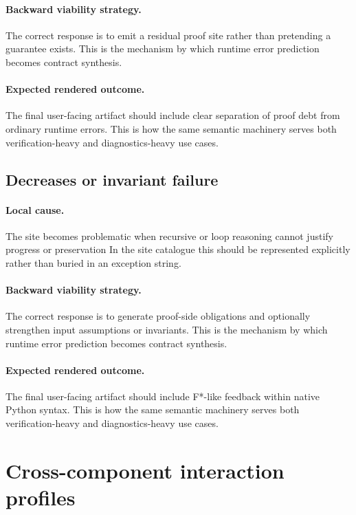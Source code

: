 \documentclass[11pt]{report}
\theoremstyle{definition}
\theoremstyle{plain}
\begin{document}
\paragraph{Backward viability strategy.}
The correct response is to emit a residual proof site rather than pretending a guarantee exists. This is the mechanism by which runtime
error prediction becomes contract synthesis.

\paragraph{Expected rendered outcome.}
The final user-facing artifact should include clear separation of proof debt from ordinary runtime errors. This is how the same
semantic machinery serves both verification-heavy and diagnostics-heavy use
cases.

\subsection{Decreases or invariant failure}

\paragraph{Local cause.}
The site becomes problematic when recursive or loop reasoning cannot justify progress or preservation In the site catalogue this should be
represented explicitly rather than buried in an exception string.

\paragraph{Backward viability strategy.}
The correct response is to generate proof-side obligations and optionally strengthen input assumptions or invariants. This is the mechanism by which runtime
error prediction becomes contract synthesis.

\paragraph{Expected rendered outcome.}
The final user-facing artifact should include F*-like feedback within native Python syntax. This is how the same
semantic machinery serves both verification-heavy and diagnostics-heavy use
cases.


\section{Cross-component interaction profiles}
\end{document}
